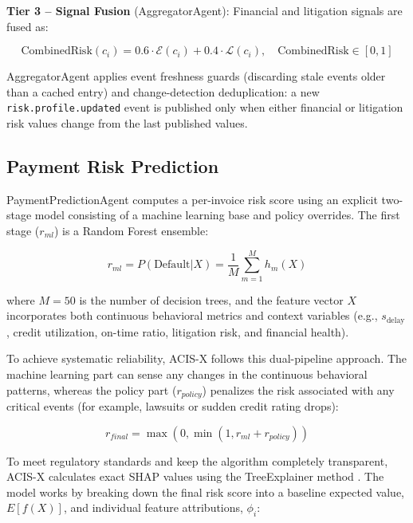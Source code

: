 ﻿\documentclass[runningheads]{llncs}
\begin{document}
\textbf{Tier 3 -- Signal Fusion} (AggregatorAgent): Financial and litigation signals are fused as:

\begin{equation}
\text{CombinedRisk}(c_i) = 0.6\cdot\mathcal{E}(c_i) + 0.4\cdot\mathcal{L}(c_i), \quad \text{CombinedRisk}\in[0,1]
\label{eq:aggregation}
\end{equation}

AggregatorAgent applies event freshness guards (discarding stale events older than a cached entry) and change-detection deduplication: a new \texttt{risk.\allowbreak profile.\allowbreak updated} event is published only when either financial or litigation risk values change from the last published values.

\subsection{Payment Risk Prediction}

PaymentPredictionAgent computes a per-invoice risk score using an explicit two-stage model consisting of a machine learning base and policy overrides. The first stage ($r_{ml}$) is a Random Forest ensemble:

\begin{equation}
r_{ml} = P(\text{Default}|X) = \frac{1}{M} \sum_{m=1}^{M} h_m(X)
\label{eq:prediction}
\end{equation}

where $M=50$ is the number of decision trees, and the feature vector $X$ incorporates both continuous behavioral metrics and context variables (e.g., $s_{\text{delay}}$, credit utilization, on-time ratio, litigation risk, and financial health). 

To achieve systematic reliability, ACIS-X follows this dual-pipeline approach. The machine learning part can sense any changes in the continuous behavioral patterns, whereas the policy part ($r_{policy}$) penalizes the risk associated with any critical events (for example, lawsuits or  sudden credit rating drops):

\begin{equation}
r_{final} = \max(0, \min(1, r_{ml} + r_{policy}))
\label{eq:twostage}
\end{equation}

To meet regulatory standards and keep the algorithm completely transparent, ACIS-X calculates exact SHAP values using the TreeExplainer method \cite{lundberg2020local}. The model works by breaking down the final risk score into a baseline expected value, $E[f(X)]$, and individual feature attributions, $\phi_i$:
\end{document}
